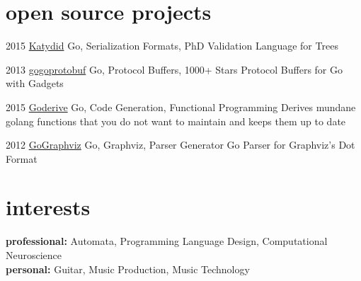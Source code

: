\documentclass[print]{friggeri-cv} %
\begin{document}
\section{open source projects}


\begin{entrylist}

\entry
{2015}
{\href{https://github.com/katydid/katydid}{Katydid}}
{Go, Serialization Formats, PhD}
{Validation Language for Trees}

\entry
{2013}
{\href{https://github.com/gogo/protobuf}{gogoprotobuf}}
{Go, Protocol Buffers, 1000+ Stars}
{Protocol Buffers for Go with Gadgets}

\entry
{2015}
{\href{https://github.com/awalterschulze/goderive}{Goderive}}
{Go, Code Generation, Functional Programming}
{Derives mundane golang functions that you do not want to maintain and keeps them up to date}

\entry
{2012}
{\href{https://github.com/awalterschulze/gographviz}{GoGraphviz}}
{Go, Graphviz, Parser Generator}
{Go Parser for Graphviz's Dot Format}

\end{entrylist}

\section{interests}

\textbf{professional:} Automata, Programming Language Design, Computational Neuroscience \\
\textbf{personal:} Guitar, Music Production, Music Technology
\end{document}

